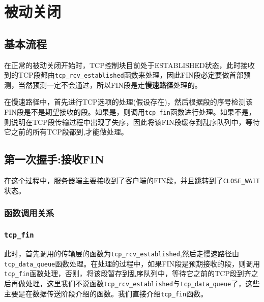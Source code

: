 \section{被动关闭}
\label{sec:passive_close}

    \subsection{基本流程}
        在正常的被动关闭开始时，TCP控制块目前处于ESTABLISHED状态，此时接收到的TCP段都由\texttt{tcp_rcv_established}函数来处理，因此FIN段必定要做首部预测，当然预测一定不会通过，所以FIN段是走\textbf{慢速路径}处理的。

        在慢速路径中，首先进行TCP选项的处理(假设存在)，然后根据段的序号检测该FIN段是不是期望接收的段。如果是，则调用\texttt{tcp_fin}函数进行处理。如果不是，则说明在TCP段传输过程中出现了失序，因此将该FIN段缓存到乱序队列中，等待它之前的所有TCP段都到,才能做处理。

    \subsection{第一次握手:接收FIN}

        在这个过程中，服务器端主要接收到了客户端的FIN段，并且跳转到了\texttt{CLOSE_WAIT}状态。
        \subsubsection{函数调用关系}
        

        \subsubsection{\texttt{tcp_fin}}
        	\label{subsubsec:tcp_fin}

            此时，首先调用的传输层的函数为\texttt{tcp_rcv_established},然后走慢速路径由\texttt{tcp_data_queue}函数处理。在处理的过程中，如果FIN段是预期接收的段，则调用\texttt{tcp_fin}函数处理，否则，将该段暂存到乱序队列中，等待它之前的TCP段到齐之后再做处理，这里我们不说函数\texttt{tcp_rcv_established}与\texttt{tcp_data_queue}了，这些主要是在数据传送阶段介绍的函数。我们直接介绍\texttt{tcp_fin}函数。

